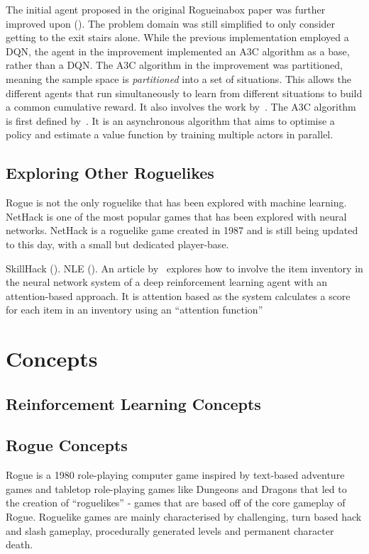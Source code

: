 \documentclass[11pt,a4paper]{article}
\begin{document}
    The initial agent proposed in the original Rogueinabox paper was further improved upon (\cite{asperti18}).
    The problem domain was still simplified to only consider getting to the exit stairs alone.
    While the previous implementation employed a DQN, the agent in the improvement implemented an A3C algorithm as a base, rather than a DQN. The A3C algorithm in the improvement was partitioned, meaning the sample space is \emph{partitioned} into a set of situations.
    This allows the different agents that run simultaneously to learn from different situations to build a common cumulative reward.
    It also involves the work by~\cite{jaderberg16}.
    The A3C algorithm is first defined by~\cite{mnih15}.
    It is an asynchronous algorithm that aims to optimise a policy and estimate a value function by training multiple actors in parallel.

    \subsection{Exploring Other Roguelikes}
    Rogue is not the only roguelike that has been explored with machine learning.
    NetHack is one of the most popular games that has been explored with neural networks.
    NetHack is a roguelike game created in 1987 and is still being updated to this day, with a small but dedicated player-base.

    SkillHack (\cite{matthews22}).
    NLE (\cite{kuttler20}).
    An article by~\cite{izumiya21} explores how to involve the item inventory in the neural network system of a deep reinforcement learning agent with an attention-based approach.
    It is attention based as the system calculates a score for each item in an inventory using an ``attention function''

    \section{Concepts}
    \subsection{Reinforcement Learning Concepts}

    \subsection{Rogue Concepts}
    Rogue is a 1980 role-playing computer game inspired by text-based adventure games and tabletop role-playing games like Dungeons and Dragons that led to the creation of ``roguelikes'' - games that are based off of the core gameplay of Rogue.
    Roguelike games are mainly characterised by challenging, turn based hack and slash gameplay, procedurally generated levels and permanent character death.
\end{document}
